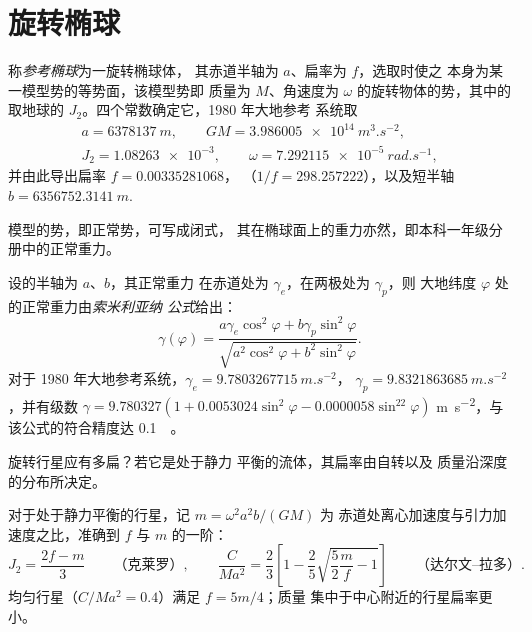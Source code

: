 \section{旋转椭球}

\begin{definition}[参考椭球]\label{def:b3:gravity-geodesy:ellipsoid}
称\emph{参考椭球}为一旋转椭球体，
其赤道半轴为 $a$、扁率为 $f$，选取时使之
本身为某一模型势的等势面，该模型势即
质量为 $M$、角速度为 $\omega$ 的旋转物体的势，其中的取地球的 $J_2$。四个常数确定它，1980 年大地参考
系统取
\begin{gather*}
  a = \qty{6378137}{m},\qquad GM = \qty{3.986005e14}{m^3.s^{-2}},\\
  J_2 = \num{1.08263e-3},\qquad \omega = \qty{7.292115e-5}{rad.s^{-1}},
\end{gather*}
并由此导出扁率 $f = \num{0.00335281068}$，
（$1/f = \num{298.257222}$），以及短半轴
$b = \qty{6356752.3141}{m}$.
\end{definition}

模型的势，即正常势，可写成闭式，
其在椭球面上的重力亦然，即本科一年级分册中的正常重力。

\begin{proposition}[索米利亚纳公式]\label{prop:b3:gravity-geodesy:somigliana}
设的半轴为 $a$、$b$，其正常重力
在赤道处为 $\gamma_e$，在两极处为 $\gamma_p$，则
大地纬度 $\varphi$ 处的正常重力由\emph{索米利亚纳
公式}给出：
\[
  \gamma(\varphi) = \frac{a\gamma_e\cos^2\varphi + b\gamma_p\sin^2\varphi}
  {\sqrt{a^2\cos^2\varphi + b^2\sin^2\varphi}} .
\]
对于 1980 年大地参考系统，$\gamma_e = \qty{9.7803267715}{m.s^{-2}}$，
$\gamma_p = \qty{9.8321863685}{m.s^{-2}}$，并有级数
$\gamma = 9.780327(1 + 0.0053024\sin^2\varphi - 0.0000058\sin^22\varphi)$
\unit{m.s^{-2}}，与该公式的符合精度达 \qty{0.1}{\milli\gal}。
\end{proposition}
\admitted

旋转行星应有多扁？若它是处于静力
平衡的流体，其扁率由自转以及
质量沿深度的分布所决定。

\begin{proposition}\label{prop:b3:gravity-geodesy:clairaut}
对于处于静力平衡的行星，记 $m = \omega^2a^2b/(GM)$ 为
赤道处离心加速度与引力加速度之比，准确到
$f$ 与 $m$ 的一阶：
\[
  J_2 = \frac{2f - m}{3}\qquad\text{（克莱罗）},\qquad
  \frac{C}{Ma^2} = \frac23\left[1 - \frac25\sqrt{\frac52\frac mf - 1}\right]
  \qquad\text{（达尔文–拉多）} .
\]
均匀行星（$C/Ma^2 = 0.4$）满足 $f = 5m/4$；质量
集中于中心附近的行星扁率更小。
\end{proposition}
\admitted

